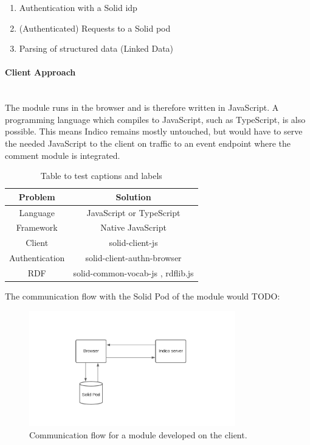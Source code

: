 \begin{enumerate}
    \item Authentication with a Solid \gls{idp}
    \item (Authenticated) Requests to a Solid pod
    \item Parsing of structured data (Linked Data)
\end{enumerate}

\paragraph{Client Approach}\mbox{}\\

The module runs in the browser and is therefore written in JavaScript. A programming language which compiles to JavaScript, such as TypeScript, is also possible. This means Indico remains mostly untouched, but would have to serve the needed JavaScript to the client on traffic to an event endpoint where the comment module is integrated.

\begin{table}[h!]
    \centering
    \begin{tabular}{c | c} 
     Problem & Solution \\
     \hline
      Language & JavaScript or TypeScript  \\
      Framework & Native JavaScript  \\
      Client & solid-client-js \cite{solid-client-js}  \\
      Authentication & solid-client-authn-browser \cite{solid-client-authn-browser} \\
      RDF & solid-common-vocab-js \cite{solid-common-vocab-js}, rdflib.js \cite{rdflib.js}  \\
    \end{tabular}
    \vspace{0.75cm}
    \caption{Table to test captions and labels}
    \label{table:1}
\end{table}

The communication flow with the Solid Pod of the module would TODO:

\begin{figure}
    \centering
    \includegraphics[width=0.8\textwidth]{prototype/graphs/poc-infrastructure-frontend.jpeg}
    \caption{Communication flow for a module developed on the client.}
    \label{fig:poc-infrastructure-frontend}
\end{figure}

